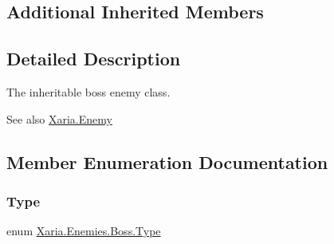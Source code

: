 \subsection*{Additional Inherited Members}


\subsection{Detailed Description}
The inheritable boss enemy class. 

\begin{DoxySeeAlso}{See also}
\hyperlink{classXaria_1_1Enemy}{Xaria.\+Enemy}


\end{DoxySeeAlso}


\subsection{Member Enumeration Documentation}
\mbox{\label{classXaria_1_1Enemies_1_1Boss_ae95ffc3618433440acbfd7aab7671b02}} 
\subsubsection{\texorpdfstring{Type}{Type}}
{\footnotesize\ttfamily enum \hyperlink{classXaria_1_1Enemies_1_1Boss_ae95ffc3618433440acbfd7aab7671b02}{Xaria.\+Enemies.\+Boss.\+Type}\hspace{0.3cm}{\ttfamily [strong]}}





